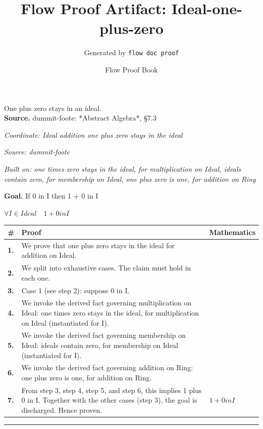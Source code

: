 \documentclass[11pt]{article}
\title{Flow Proof Artifact: Ideal-one-plus-zero}
\author{Generated by \texttt{flow doc proof}}
\date{Flow Proof Book}
\theoremstyle{definition}
\begin{document}
\maketitle
One plus zero stays in an ideal.\\[0.5em]
\textbf{Source.} dummit-foote: *Abstract Algebra*, §7.3\\[0.5em]
\bigskip
{}\par
\smallskip\noindent\textit{Coordinate: Ideal \cdot addition \cdot one plus zero stays in the ideal}\par
\smallskip\noindent\textit{Source: dummit-foote}\par
\smallskip\noindent\textit{Built on: one times zero stays in the ideal, for multiplication on Ideal, ideals contain zero, for membership on Ideal, one plus zero is one, for addition on Ring}\par
\medskip
\noindent\textbf{Goal.} If 0 in I then 1 + 0 in I\par
\noindent$\displaystyle \forall I \in Ideal\quad 1 + 0 in I$\par
\medskip
\noindent
\begin{tabular}{@{} >{\raggedright\arraybackslash}p{} >{\raggedright\arraybackslash}p{} >{\raggedleft\arraybackslash}p{} @{}}
\textbf{\#} & \textbf{Proof} & \textbf{Mathematics} \\
\midrule
\textbf{1.} & We prove that one plus zero stays in the ideal for addition on Ideal. & \\[0.45em]
\textbf{2.} & We split into exhaustive cases. The claim must hold in each one. & \\[0.45em]
\textbf{3.} & Case 1 (see step 2): suppose 0 in I. & \\[0.45em]
\textbf{4.} & We invoke the derived fact governing multiplication on Ideal: one times zero stays in the ideal, for multiplication on Ideal (instantiated for I). & \\[0.45em]
\textbf{5.} & We invoke the derived fact governing membership on Ideal: ideals contain zero, for membership on Ideal (instantiated for I). & \\[0.45em]
\textbf{6.} & We invoke the derived fact governing addition on Ring: one plus zero is one, for addition on Ring. & \\[0.45em]
\textbf{7.} & From step 3, step 4, step 5, and step 6, this implies 1 plus 0 in I. Together with the other cases (step 3), the goal is discharged. Hence proven. & $\displaystyle 1 + 0 in I$ \\[0.45em]
\bottomrule
\end{tabular}
\label{thm:Ideal-addition-one_plus_zero_stays_in_the_ideal}
\par\medskip\hrule
\end{document}
